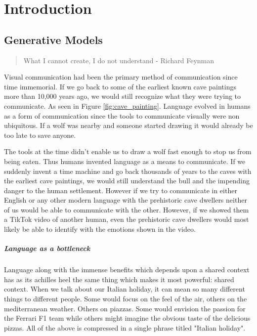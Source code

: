 \chapter{Introduction}

\section{Generative Models}
\label{sec:intro_generative_models}

\begin{quote}
	What I cannot create, I do not understand - Richard Feynman
\end{quote}



Visual communication had been the primary method of communication since time immemorial. If we go back to some of the earliest known cave paintings more than 10,000 years ago, we would still recognize what they were trying to communicate. As seen in Figure \ref{fig:cave_painting}. Language evolved in humans as a form of communication since the tools to communicate visually were non ubiquitous. If a wolf was nearby and someone started drawing it would already be too late to save anyone.

The tools at the time didn't enable us to draw a wolf fast enough to stop us from being eaten. Thus humans invented language as a means to communicate. If we suddenly invent a time machine and go back thousands of years to the caves with the earliest cave paintings, we would still understand the bull and the impending danger to the human settlement. However if we try to communicate in either English or any other modern language with the prehistoric cave dwellers neither of us would be able to communicate with the other. However, if we showed them a TikTok video of another human, even the prehistoric cave dwellers would most likely be able to identify with the emotions shown in the video. 

\paragraph{Language  as  a bottleneck}
Language along with the immense benefits which depends upon a shared context has as its achilles heel the same thing which makes it most powerful: shared context. When we talk about our Italian holiday, it can mean so many different things to different people. Some would focus on the feel of the air, others on the mediterranean weather. Others on piazzas. Some would envision the passion for the Ferrari F1 team while others might imagine the obvious taste of the delicious pizzas. All of the above is compressed in a single phrase titled "Italian holiday".


